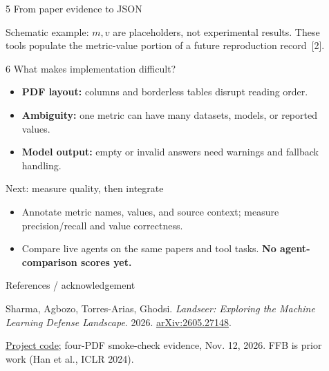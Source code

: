 \documentclass[final]{beamer}
\newlength{\sepwidth}
\newlength{\colwidth}
\newcommand{\separatorcolumn}{\begin{column}{\sepwidth}\end{column}}
\begin{document}
\begin{frame}[t]
\begin{columns}[t]
\begin{column}{\colwidth}
\begin{block}{5 \enspace From paper evidence to JSON}
\begin{center}
\end{center}
{\fontsize{22}{28}\selectfont Schematic example: $m,v$ are placeholders, not experimental results. These tools populate the metric-value portion of a future reproduction record~[2].}
\end{block}
\vspace{0.8cm}
\begin{block}{6 \enspace What makes implementation difficult?}
\begin{itemize}
\item \textbf{PDF layout:} columns and borderless tables disrupt reading order.
\item \textbf{Ambiguity:} one metric can have many datasets, models, or reported values.
\item \textbf{Model output:} empty or invalid answers need warnings and fallback handling.
\end{itemize}
\end{block}
\vspace{0.6cm}
\begin{alertblock}{Next: measure quality, then integrate}
\begin{itemize}
\item Annotate metric names, values, and source context; measure precision/recall and value correctness.
\item Compare live agents on the same papers and tool tasks. \textbf{No agent-comparison scores yet.}
\end{itemize}
\end{alertblock}
\vspace{0.5cm}
\begin{block}{References / acknowledgement}
{\fontsize{20}{25}\selectfont
[1] Sharma, Agbozo, Torres-Arias, Ghodsi. \emph{Landseer: Exploring the Machine Learning Defense Landscape}. 2026. \href{https://arxiv.org/abs/2605.27148}{arXiv:2605.27148}.\par
[2] \href{https://github.com/Auspr7ng/fair_fairness_benchmark}{Project code}; four-PDF smoke-check evidence, Nov. 12, 2026. FFB is prior work (Han et al., ICLR 2024).\par}
\end{block}
\end{column}
\separatorcolumn
\end{columns}
\end{frame}
\end{document}
